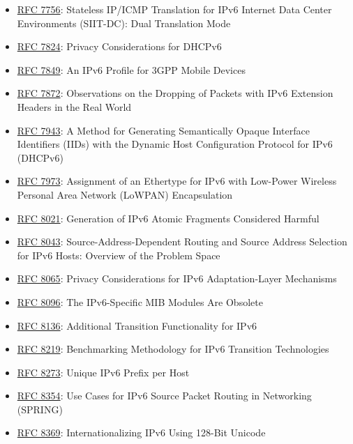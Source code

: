 \documentclass[
]{article}
\begin{document}
\begin{itemize}
\item
  \href{https://www.rfc-editor.org/info/rfc7756}{RFC 7756}: Stateless
  IP/ICMP Translation for IPv6 Internet Data Center Environments
  (SIIT-DC): Dual Translation Mode
\item
  \href{https://www.rfc-editor.org/info/rfc7824}{RFC 7824}: Privacy
  Considerations for DHCPv6
\item
  \href{https://www.rfc-editor.org/info/rfc7849}{RFC 7849}: An IPv6
  Profile for 3GPP Mobile Devices
\item
  \href{https://www.rfc-editor.org/info/rfc7872}{RFC 7872}: Observations
  on the Dropping of Packets with IPv6 Extension Headers in the Real
  World
\item
  \href{https://www.rfc-editor.org/info/rfc7943}{RFC 7943}: A Method for
  Generating Semantically Opaque Interface Identifiers (IIDs) with the
  Dynamic Host Configuration Protocol for IPv6 (DHCPv6)
\item
  \href{https://www.rfc-editor.org/info/rfc7973}{RFC 7973}: Assignment
  of an Ethertype for IPv6 with Low-Power Wireless Personal Area Network
  (LoWPAN) Encapsulation
\item
  \href{https://www.rfc-editor.org/info/rfc8021}{RFC 8021}: Generation
  of IPv6 Atomic Fragments Considered Harmful
\item
  \href{https://www.rfc-editor.org/info/rfc8043}{RFC 8043}:
  Source-Address-Dependent Routing and Source Address Selection for IPv6
  Hosts: Overview of the Problem Space
\item
  \href{https://www.rfc-editor.org/info/rfc8065}{RFC 8065}: Privacy
  Considerations for IPv6 Adaptation-Layer Mechanisms
\item
  \href{https://www.rfc-editor.org/info/rfc8096}{RFC 8096}: The
  IPv6-Specific MIB Modules Are Obsolete
\item
  \href{https://www.rfc-editor.org/info/rfc8136}{RFC 8136}: Additional
  Transition Functionality for IPv6
\item
  \href{https://www.rfc-editor.org/info/rfc8219}{RFC 8219}: Benchmarking
  Methodology for IPv6 Transition Technologies
\item
  \href{https://www.rfc-editor.org/info/rfc8273}{RFC 8273}: Unique IPv6
  Prefix per Host
\item
  \href{https://www.rfc-editor.org/info/rfc8354}{RFC 8354}: Use Cases
  for IPv6 Source Packet Routing in Networking (SPRING)
\item
  \href{https://www.rfc-editor.org/info/rfc8369}{RFC 8369}:
  Internationalizing IPv6 Using 128-Bit Unicode

\end{itemize}
\end{document}

